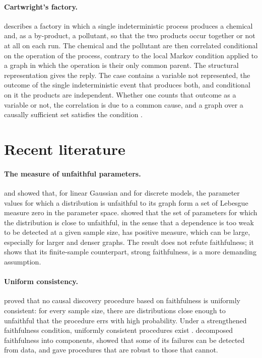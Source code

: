 \documentclass{situationist-preprint}
\begin{document}
\paragraph{Cartwright's factory.} \citet{Cartwright1999} describes a factory in which a single indeterministic process produces a chemical and, as a by-product, a pollutant, so that the two products occur together or not at all on each run. The chemical and the pollutant are then correlated conditional on the operation of the process, contrary to the local Markov condition applied to a graph in which the operation is their only common parent. The structural representation gives the reply. The case contains a variable not represented, the outcome of the single indeterministic event that produces both, and conditional on it the products are independent. Whether one counts that outcome as a variable or not, the correlation is due to a common cause, and a graph over a causally sufficient set satisfies the condition \citep{Hausman1999}.

\section{Recent literature}\label{s:recent}

\paragraph{The measure of unfaithful parameters.} \citet{SGS2000} and \citet{Meek1995a} showed that, for linear Gaussian and for discrete models, the parameter values for which a distribution is unfaithful to its graph form a set of Lebesgue measure zero in the parameter space. \citet{Uhler2013} showed that the set of parameters for which the distribution is close to unfaithful, in the sense that a dependence is too weak to be detected at a given sample size, has positive measure, which can be large, especially for larger and denser graphs. The result does not refute faithfulness; it shows that its finite-sample counterpart, strong faithfulness, is a more demanding assumption.

\paragraph{Uniform consistency.} \citet{Robins2003} proved that no causal discovery procedure based on faithfulness is uniformly consistent: for every sample size, there are distributions close enough to unfaithful that the procedure errs with high probability. Under a strengthened faithfulness condition, uniformly consistent procedures exist \citep{Kalisch2007}. \citet{ZhangSpirtes2008} decomposed faithfulness into components, showed that some of its failures can be detected from data, and gave procedures that are robust to those that cannot.
\end{document}
